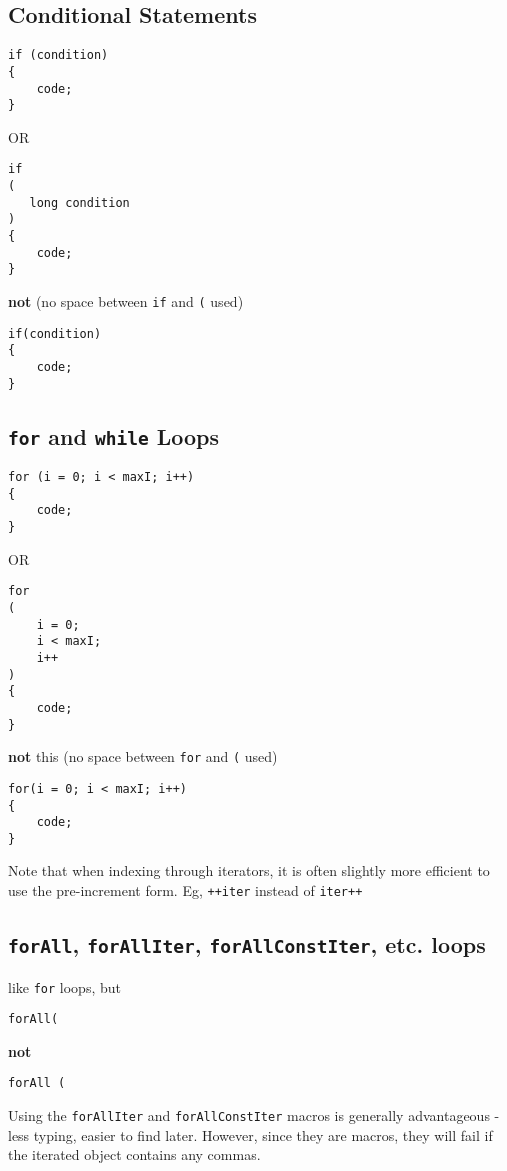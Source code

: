 \documentclass[11pt]{article}
\begin{document}
\subsection{Conditional Statements}
\label{sec-1-5}


\begin{verbatim}
if (condition)
{
    code;
}
\end{verbatim}
    OR

\begin{verbatim}
if
(
   long condition
)
{
    code;
}
\end{verbatim}
    \textbf{not} (no space between \texttt{if} and \texttt{(} used)

\begin{verbatim}
if(condition)
{
    code;
}
\end{verbatim}
\subsection{\texttt{for} and \texttt{while} Loops}
\label{sec-1-6}


\begin{verbatim}
for (i = 0; i < maxI; i++)
{
    code;
}
\end{verbatim}
    OR

\begin{verbatim}
for
(
    i = 0;
    i < maxI;
    i++
)
{
    code;
}
\end{verbatim}
    \textbf{not} this (no space between \texttt{for} and \texttt{(} used)

\begin{verbatim}
for(i = 0; i < maxI; i++)
{
    code;
}
\end{verbatim}
    Note that when indexing through iterators, it is often slightly more
    efficient to use the pre-increment form. Eg, \texttt{++iter} instead of \texttt{iter++}
\subsection{\texttt{forAll}, \texttt{forAllIter}, \texttt{forAllConstIter}, etc. loops}
\label{sec-1-7}

    like \texttt{for} loops, but

\begin{verbatim}
forAll(
\end{verbatim}
    \textbf{not}

\begin{verbatim}
forAll (
\end{verbatim}
    Using the \texttt{forAllIter} and \texttt{forAllConstIter} macros is generally
    advantageous - less typing, easier to find later.  However, since
    they are macros, they will fail if the iterated object contains
    any commas.
\end{document}

